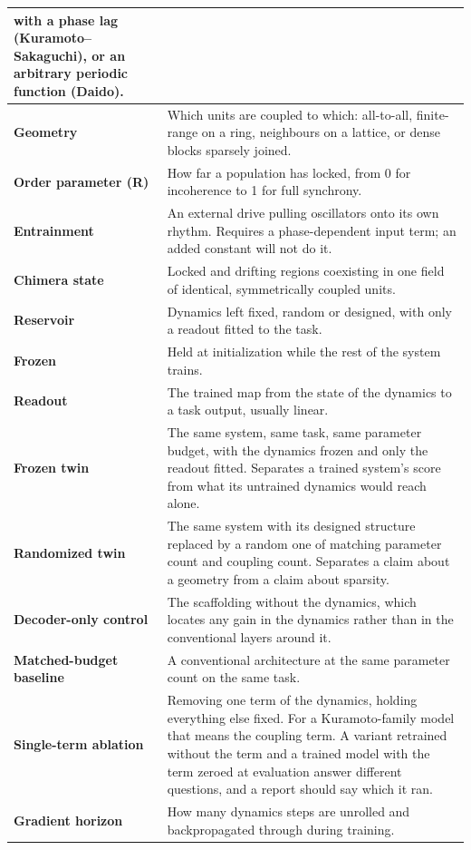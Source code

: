 \documentclass[10pt]{article}
\begin{document}
\begin{longtable}[]{@{}
  >{\raggedright\arraybackslash}p{}
  >{\raggedright\arraybackslash}p{}@{}}
with a phase lag (Kuramoto--Sakaguchi), or an arbitrary periodic
function (Daido). \\
\cmidrule{1-2}\textbf{Geometry} & Which units are coupled to which:
all-to-all, finite-range on a ring, neighbours on a lattice, or dense
blocks sparsely joined. \\
\cmidrule{1-2}\textbf{Order parameter (R)} & How far a population has
locked, from 0 for incoherence to 1 for full synchrony. \\
\cmidrule{1-2}\textbf{Entrainment} & An external drive pulling
oscillators onto its own rhythm. Requires a phase-dependent input term;
an added constant will not do it. \\
\cmidrule{1-2}\textbf{Chimera state} & Locked and drifting regions
coexisting in one field of identical, symmetrically coupled units. \\
\cmidrule{1-2}\textbf{Reservoir} & Dynamics left fixed, random or
designed, with only a readout fitted to the task. \\
\cmidrule{1-2}\textbf{Frozen} & Held at initialization while the rest of
the system trains. \\
\cmidrule{1-2}\textbf{Readout} & The trained map from the state of the
dynamics to a task output, usually linear. \\
\cmidrule{1-2}\textbf{Frozen twin} & The same system, same task, same
parameter budget, with the dynamics frozen and only the readout fitted.
Separates a trained system's score from what its untrained dynamics
would reach alone. \\
\cmidrule{1-2}\textbf{Randomized twin} & The same system with its
designed structure replaced by a random one of matching parameter count
and coupling count. Separates a claim about a geometry from a claim
about sparsity. \\
\cmidrule{1-2}\textbf{Decoder-only control} & The scaffolding without
the dynamics, which locates any gain in the dynamics rather than in the
conventional layers around it. \\
\cmidrule{1-2}\textbf{Matched-budget baseline} & A conventional
architecture at the same parameter count on the same task. \\
\cmidrule{1-2}\textbf{Single-term ablation} & Removing one term of the
dynamics, holding everything else fixed. For a Kuramoto-family model
that means the coupling term. A variant retrained without the term and a
trained model with the term zeroed at evaluation answer different
questions, and a report should say which it ran. \\
\cmidrule{1-2}\textbf{Gradient horizon} & How many dynamics steps are
unrolled and backpropagated through during training. \\
\end{longtable}
\end{document}
